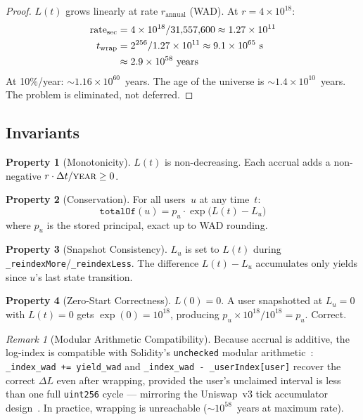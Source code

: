 \documentclass[10pt,a4paper,twocolumn]{article}
\theoremstyle{definition}
\newtheorem{property}{Property}[section]
\theoremstyle{plain}
\theoremstyle{remark}
\newtheorem{remark}{Remark}[section]
\begin{document}
\begin{proof}
$L(t)$ grows linearly at rate $r_{\text{annual}}$ (WAD). At $r = 4 \times 10^{18}$:
\begin{align}
\text{rate}_{\text{sec}} &= 4 \times 10^{18} / 31{,}557{,}600 \approx 1.27 \times 10^{11} \notag \\
t_{\text{wrap}} &= 2^{256} / 1.27 \times 10^{11} \approx 9.1 \times 10^{65}\text{~s} \notag \\
&\approx 2.9 \times 10^{58}\text{~years}
\end{align}
At 10\%/year: ${\sim}1.16 \times 10^{60}$~years. The age of the universe is ${\sim}1.4 \times 10^{10}$~years. The problem is eliminated, not deferred.
\end{proof}

\subsection{Invariants}
\label{subsec:invariants}

\begin{property}[Monotonicity]
\label{prop:monotone}
$L(t)$ is non-decreasing. Each accrual adds a non-negative $r \cdot \Delta t / \textsc{year} \geq 0$.
\end{property}

\begin{property}[Conservation]
\label{prop:conservation}
For all users~$u$ at any time~$t$:
\begin{equation}
\texttt{totalOf}(u) = p_u \cdot \exp\bigl(L(t) - L_u\bigr)
\end{equation}
where $p_u$ is the stored principal, exact up to WAD rounding.
\end{property}

\begin{property}[Snapshot Consistency]
\label{prop:snapshot}
$L_u$ is set to $L(t)$ during \texttt{\_reindexMore}/\texttt{\_reindexLess}. The difference $L(t) - L_u$ accumulates only yields since $u$'s last state transition.
\end{property}

\begin{property}[Zero-Start Correctness]
\label{prop:zero-start}
$L(0) = 0$. A user snapshotted at $L_u = 0$ with $L(t) = 0$ gets $\exp(0) = 10^{18}$, producing $p_u \times 10^{18} / 10^{18} = p_u$. Correct.
\end{property}

\begin{remark}[Modular Arithmetic Compatibility]
\label{rem:modular}
Because accrual is additive, the log-index is compatible with Solidity's \texttt{unchecked} modular arithmetic~\cite{solidity2024}: \texttt{\_index\_wad += yield\_wad} and \texttt{\_index\_wad - \_userIndex[user]} recover the correct $\Delta L$ even after wrapping, provided the user's unclaimed interval is less than one full \texttt{uint256} cycle --- mirroring the Uniswap~v3 tick accumulator design~\cite{uniswap2021}. In practice, wrapping is unreachable (${\sim}10^{58}$~years at maximum rate).
\end{remark}
\end{document}

